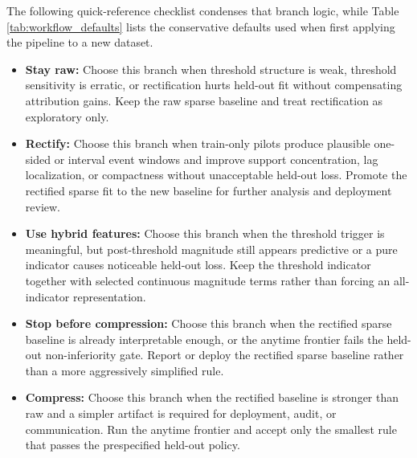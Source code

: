 The following quick-reference checklist condenses that branch logic, while Table \ref{tab:workflow_defaults} lists the conservative defaults used when first applying the pipeline to a new dataset.

\begin{itemize}[leftmargin=*,itemsep=0.25em]
    \item \textbf{Stay raw:} Choose this branch when threshold structure is weak, threshold sensitivity is erratic, or rectification hurts held-out fit without compensating attribution gains. Keep the raw sparse baseline and treat rectification as exploratory only.
    \item \textbf{Rectify:} Choose this branch when train-only pilots produce plausible one-sided or interval event windows and improve support concentration, lag localization, or compactness without unacceptable held-out loss. Promote the rectified sparse fit to the new baseline for further analysis and deployment review.
    \item \textbf{Use hybrid features:} Choose this branch when the threshold trigger is meaningful, but post-threshold magnitude still appears predictive or a pure indicator causes noticeable held-out loss. Keep the threshold indicator together with selected continuous magnitude terms rather than forcing an all-indicator representation.
    \item \textbf{Stop before compression:} Choose this branch when the rectified sparse baseline is already interpretable enough, or the anytime frontier fails the held-out non-inferiority gate. Report or deploy the rectified sparse baseline rather than a more aggressively simplified rule.
    \item \textbf{Compress:} Choose this branch when the rectified baseline is stronger than raw and a simpler artifact is required for deployment, audit, or communication. Run the anytime frontier and accept only the smallest rule that passes the prespecified held-out policy.
\end{itemize}

